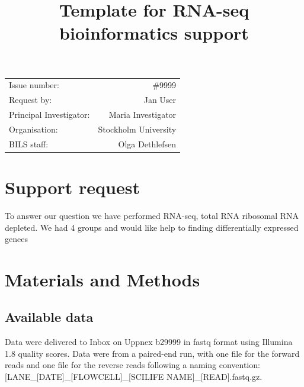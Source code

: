 \documentclass[12pt]{article}
\newcommand{\staff}{Olga Dethlefsen}
\newcommand{\noIssue}{\#9999}
\newcommand{\noUppmax}{b29999}
\begin{document}
\pagestyle{fancy}


\title{Template for RNA-seq bioinformatics support}
\author{}
\maketitle
\thispagestyle{fancy}

\vspace{2cm}
\begin{center}
\begin{tabular}{l r}
Issue number: & {\noIssue} \\
Request by: & Jan User \\ 
Principal Investigator: & Maria Investigator \\
Organisation: & Stockholm University \\
BILS staff: & {\staff}
\end{tabular}
\end{center}

\newpage
\tableofcontents

\newpage
\section{Support request}

To answer our question we have performed RNA-seq, total RNA ribosomal RNA depleted. We had 4 groups and would like help to finding differentially expressed genees


\section{Materials and Methods}
\subsection{Available data}
Data were delivered to Inbox on Uppnex {\noUppmax} in fastq format using Illumina 1.8 quality scores. Data were from a paired-end run, with one file for the forward reads and one file for the reverse reads following a naming convention: [LANE\_[DATE]\_[FLOWCELL]\_[SCILIFE NAME]\_[READ].fastq.gz. 
\end{document}

